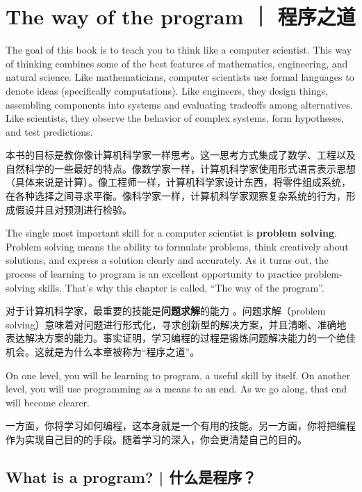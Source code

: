 


\chapter{The way of the program  ｜  程序之道}

The goal of this book is to teach you to think like a computer
scientist.  This way of thinking combines some of the best features of
mathematics, engineering, and natural science.  Like mathematicians,
computer scientists use formal languages to denote ideas (specifically
computations).  Like engineers, they design things, assembling
components into systems and evaluating tradeoffs among alternatives.
Like scientists, they observe the behavior of complex systems, form
hypotheses, and test predictions.

本书的目标是教你像计算机科学家一样思考。这一思考方式集成了数学、工程以及自然科学的一些最好的特点。像数学家一样，计算机科学家使用形式语言表示思想（具体来说是计算）。像工程师一样，计算机科学家设计东西，将零件组成系统，在各种选择之间寻求平衡。像科学家一样，计算机科学家观察复杂系统的行为，形成假设并且对预测进行检验。
  

The single most important skill for a computer scientist is {\bf
  problem solving}.  Problem solving means the ability to formulate
problems, think creatively about solutions, and express a solution
clearly and accurately.  As it turns out, the process of learning to
program is an excellent opportunity to practice problem-solving
skills.  That's why this chapter is called, ``The way of the
program''.

对于计算机科学家，最重要的技能是\textbf{问题求解}的能力 。问题求解（problem solving）意味着对问题进行形式化，寻求创新型的解决方案，并且清晰、准确地表达解决方案的能力。事实证明，学习编程的过程是锻炼问题解决能力的一个绝佳机会。这就是为什么本章被称为“程序之道”。

On one level, you will be learning to program, a useful skill by
itself.  On another level, you will use programming as a means to an
end.  As we go along, that end will become clearer.

一方面，你将学习如何编程，这本身就是一个有用的技能。另一方面，你将把编程作为实现自己目的的手段。随着学习的深入，你会更清楚自己的目的。

\section{What is a program?  |  什么是程序？}

